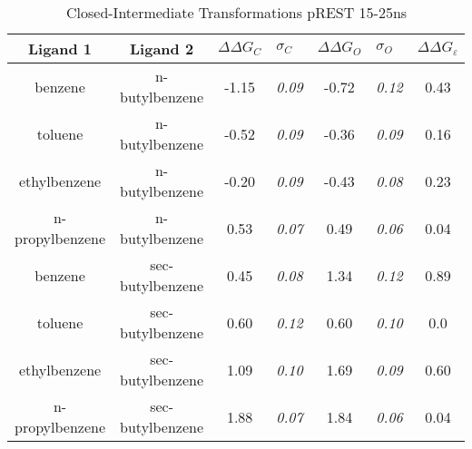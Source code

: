 \documentclass[T4paper.tex]{subfiles}
\begin{document}
\begin{table}[!htb]
\centering
\caption{Closed-Intermediate Transformations pREST 15-25ns}
\label{tbl:C-I_pRESText}
\begin{tabular}{|c|c|c|l|c|l|c|}
\hline
\textbf{Ligand 1}       & \textbf{Ligand 2}    & {\color[HTML]{800080} \boldmath$\Delta\Delta G_{C}$} & {\color[HTML]{800080} \boldmath$\sigma_{C}$} & {\color[HTML]{008000} \boldmath$\Delta\Delta G_{O}$} & {\color[HTML]{008000} \boldmath$\sigma_{O}$} & \boldmath$\Delta\Delta G_{\varepsilon}$ \\ \hline
benzene         & n-butylbenzene   & -1.15                                   & \textit{0.09}                       & -0.72                                & \textit{0.12}                       & \cellcolor[HTML]{9AFF99}0.43 \\ \hline
toluene         & n-butylbenzene   & -0.52                                  & \textit{0.09}                       & -0.36                                & \textit{0.09}                       & \cellcolor[HTML]{9AFF99}0.16 \\ \hline
ethylbenzene    & n-butylbenzene   & -0.20                                   & \textit{0.09}                       & -0.43                                & \textit{0.08}                       & \cellcolor[HTML]{9AFF99}0.23 \\ \hline
n-propylbenzene & n-butylbenzene   & 0.53                                  & \textit{0.07}                       & 0.49                                 & \textit{0.06}                       & \cellcolor[HTML]{9AFF99}0.04 \\ \hline
benzene         & sec-butylbenzene & 0.45                                   & \textit{0.08}                       & 1.34                                 & \textit{0.12}                       & \cellcolor[HTML]{9AFF99}0.89 \\ \hline
toluene         & sec-butylbenzene & 0.60                                   & \textit{0.12}                       & 0.60                                 & \textit{0.10}                       & \cellcolor[HTML]{9AFF99}0.0 \\ \hline
ethylbenzene    & sec-butylbenzene & 1.09                                   & \textit{0.10}                       & 1.69                                 & \textit{0.09}                       & \cellcolor[HTML]{9AFF99}0.60 \\ \hline
n-propylbenzene & sec-butylbenzene & 1.88                                   & \textit{0.07}                       & 1.84                                 & \textit{0.06}                       & \cellcolor[HTML]{9AFF99}0.04 \\ \hline
\end{tabular}
\end{table}
\end{document}
